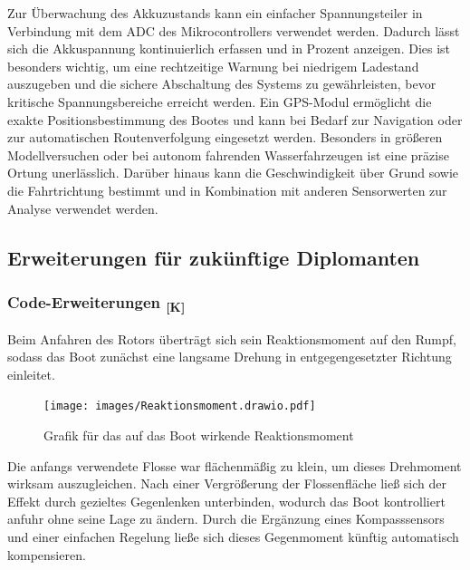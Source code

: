 \documentclass[a4paper,12pt]{article}
\begin{document}
\newline \newline
Zur Überwachung des Akkuzustands kann ein einfacher Spannungsteiler in Verbindung mit dem ADC des Mikrocontrollers verwendet werden. Dadurch lässt sich die Akkuspannung kontinuierlich erfassen und in Prozent anzeigen. Dies ist besonders wichtig, um eine rechtzeitige Warnung bei niedrigem Ladestand auszugeben und die sichere Abschaltung des Systems zu gewährleisten, bevor kritische Spannungsbereiche erreicht werden.
\newline \newline
Ein GPS-Modul ermöglicht die exakte Positionsbestimmung des Bootes und kann bei Bedarf zur Navigation oder zur automatischen Routenverfolgung eingesetzt werden. Besonders in größeren Modellversuchen oder bei autonom fahrenden Wasserfahrzeugen ist eine präzise Ortung unerlässlich. Darüber hinaus kann die Geschwindigkeit über Grund sowie die Fahrtrichtung bestimmt und in Kombination mit anderen Sensorwerten zur Analyse verwendet werden.


\newpage

\subsection{Erweiterungen für zukünftige Diplomanten}
    

\subsubsection{\texorpdfstring{Code-Erweiterungen \textsubscript{[K]}}{Code- und Sensorerweiterungen [K]}}

Beim Anfahren des Rotors überträgt sich sein Reaktionsmoment auf den Rumpf, sodass das Boot zunächst eine langsame Drehung in entgegengesetzter Richtung einleitet. 
\begin{figure}[H]
    \centering
    \texttt{[image: images/Reaktionsmoment.drawio.pdf]}
    \caption{Grafik für das auf das Boot wirkende Reaktionsmoment}
    \label{fig:Reaktionsmoment}
\end{figure}
Die anfangs verwendete Flosse war flächenmäßig zu klein, um dieses Drehmoment wirksam auszugleichen. Nach einer Vergrößerung der Flossenfläche ließ sich der Effekt durch gezieltes Gegenlenken unterbinden, wodurch das Boot kontrolliert anfuhr ohne seine Lage zu ändern. Durch die Ergänzung eines Kompasssensors und einer einfachen Regelung ließe sich dieses Gegenmoment künftig automatisch kompensieren.
\end{document}
